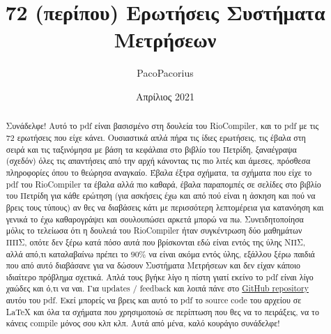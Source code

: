 \documentclass{article}
\title{72 (περίπου) Ερωτήσεις Συστήματα Μετρήσεων}
\author{\foreignlanguage{english}{PacoPacorius}}
\date{Απρίλιος 2021}
\begin{document}
\maketitle

\renewcommand{\abstractname}{Εισαγωγικό σημείωμα}
\begin{abstract}
    Συνάδελφε! Αυτό το \foreignlanguage{english}{pdf} είναι βασισμένο στη δουλεία του \foreignlanguage{english}{RioCompiler}, και το 
    \foreignlanguage{english}{pdf} με τις 72 ερωτήσεις που είχε κάνει. Ουσιαστικά απλά πήρα τις ίδιες ερωτήσεις, τις έβαλα στη σειρά και τις ταξινόμησα με βάση τα 
    κεφάλαια στο βιβλίο του Πετρίδη, ξαναέγραψα (σχεδόν) όλες τις απαντήσεις από την αρχή κάνοντας τις πιο λιτές και άμεσες, πρόσθεσα πληροφορίες όπου το θεώρησα αναγκαίο. 
    Έβαλα έξτρα σχήματα, τα σχήματα που είχε το \foreignlanguage{english}{pdf} του \foreignlanguage{english}{RioCompiler} τα έβαλα αλλά πιο καθαρά, έβαλα παραπομπές 
    σε σελίδες στο βιβλίο του Πετρίδη για κάθε ερώτηση (για ασκήσεις έχω και από πού είναι η άσκηση και πού να βρεις τους τύπους) αν θες να διαβάσεις κάτι με περισσότερη 
    λεπτομέρεια για κατανόηση και γενικά το έχω καθαρογράψει και σουλουπώσει αρκετά μπορώ να πω. 
\newline
    Συνειδητοποίησα μόλις το τελείωσα ότι η δουλειά του \foreignlanguage{english}{RioCompiler} ήταν συγκέντρωση δύο μαθημάτων ΠΠΣ, οπότε δεν ξέρω κατά πόσο αυτά που 
    βρίσκονται εδώ είναι εντός της ύλης ΝΠΣ, αλλά από,τι καταλαβαίνω πρέπει το $90\%$ να είναι ακόμα εντός ύλης, εξάλλου ξέρω παιδιά που από αυτό διαβάσανε για να δώσουν
    Συστήματα Μετρήσεων και δεν είχαν κάποιο ιδιαίτερο πρόβλημα σχετικά. Απλά τους βγήκε λίγο η πίστη γιατί εκείνο το \foreignlanguage{english}{pdf} είναι λίγο χαώδες και
    ό,τι να ναι.
\newline
    Για \foreignlanguage{english}{updates} $/$ \foreignlanguage{english}{feedback} και λοιπά πάνε στο \foreignlanguage{english}{\href{https://github.com/PacoPacorius/sis-metrisewn-72-erwtiseis-remaster}{GitHub repository}} 
    αυτόυ του \foreignlanguage{english}{pdf}. Εκεί μπορείς να βρεις και αυτό το \foreignlanguage{english}{pdf} το \foreignlanguage{english}{source code} του αρχείου σε
    \foreignlanguage{english}{LaTeX} και όλα τα σχήματα που χρησιμοποιώ σε περίπτωση που θες να το πειράξεις, να το κάνεις \foreignlanguage{english}{compile} μόνος σου
    κλπ κλπ.
\newline
    Αυτά από μένα, καλό κουράγιο συνάδελφε!
\end{abstract}
\end{document}
